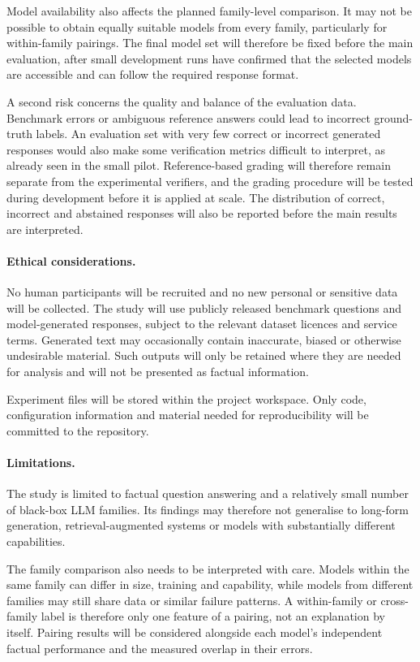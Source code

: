 \documentclass[11pt,a4paper]{article}
\begin{document}
	Model availability also affects the planned family-level comparison. It may not be possible to obtain equally suitable models from every family, particularly for within-family pairings. The final model set will therefore be fixed before the main evaluation, after small development runs have confirmed that the selected models are accessible and can follow the required response format.
	
	A second risk concerns the quality and balance of the evaluation data. Benchmark errors or ambiguous reference answers could lead to incorrect ground-truth labels. An evaluation set with very few correct or incorrect generated responses would also make some verification metrics difficult to interpret, as already seen in the small pilot. Reference-based grading will therefore remain separate from the experimental verifiers, and the grading procedure will be tested during development before it is applied at scale. The distribution of correct, incorrect and abstained responses will also be reported before the main results are interpreted.
	
	\paragraph{Ethical considerations.}
	No human participants will be recruited and no new personal or sensitive data will be collected. The study will use publicly released benchmark questions and model-generated responses, subject to the relevant dataset licences and service terms. Generated text may occasionally contain inaccurate, biased or otherwise undesirable material. Such outputs will only be retained where they are needed for analysis and will not be presented as factual information.
	
	Experiment files will be stored within the project workspace. Only code, configuration information and material needed for reproducibility will be committed to the repository.
	
	\paragraph{Limitations.}
	The study is limited to factual question answering and a relatively small number of black-box LLM families. Its findings may therefore not generalise to long-form generation, retrieval-augmented systems or models with substantially different capabilities.
	
	The family comparison also needs to be interpreted with care. Models within the same family can differ in size, training and capability, while models from different families may still share data or similar failure patterns. A within-family or cross-family label is therefore only one feature of a pairing, not an explanation by itself. Pairing results will be considered alongside each model's independent factual performance and the measured overlap in their errors.
	
\end{document}
